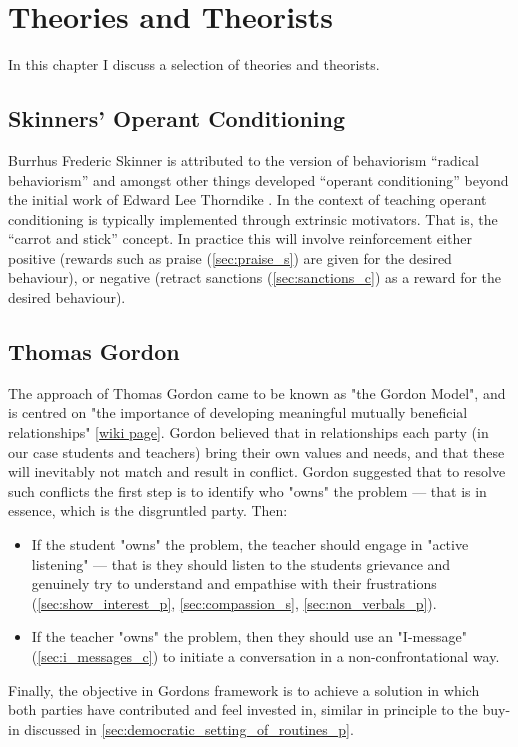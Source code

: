 \documentclass[12pt]{report}
\begin{document}
\chapter{Theories and Theorists}
\label{chap:theories}

In this chapter I discuss a selection of theories and theorists.




\section{Skinners' Operant Conditioning}
\label{sec:skinner_theory}

Burrhus Frederic Skinner is attributed to the version of behaviorism ``radical behaviorism'' \cite{Skinner2011} and amongst other things developed ``operant conditioning'' \cite{Skinner1950} beyond the initial work of Edward Lee Thorndike \cite{Thorndike1898}. In the context of teaching operant conditioning is typically implemented through extrinsic motivators. That is, the ``carrot and stick'' concept. In practice this will involve reinforcement either positive (rewards such as praise (\ref{sec:praise_s}) are given for the desired behaviour), or negative (retract sanctions (\ref{sec:sanctions_c}) as a reward for the desired behaviour).



\section{Thomas Gordon}
\label{sec:gordon_theory}

The approach of Thomas Gordon came to be known as "the Gordon Model", and is centred on "the importance of developing meaningful mutually beneficial relationships" [\href{https://en.wikibooks.org/wiki/Classroom_Management_Theorists_and_Theories/Thomas_Gordon}{wiki page}]. Gordon believed that in relationships each party (in our case students and teachers) bring their own values and needs, and that these will inevitably not match and result in conflict. Gordon suggested that to resolve such conflicts the first step is to identify who "owns" the problem --- that is in essence, which is the disgruntled party. Then:
\begin{itemize}
  \item If the student "owns" the problem, the teacher should engage in "active listening" --- that is they should listen to the students grievance and genuinely try to understand and empathise with their frustrations (\ref{sec:show_interest_p}, \ref{sec:compassion_s}, \ref{sec:non_verbals_p}).
  \item If the teacher "owns" the problem, then they should use an "I-message" (\ref{sec:i_messages_c}) to initiate a conversation in a non-confrontational way.
\end{itemize}
Finally, the objective in Gordons framework is to achieve a solution in which both parties have contributed and feel invested in, similar in principle to the buy-in discussed in \ref{sec:democratic_setting_of_routines_p}.
\end{document}
